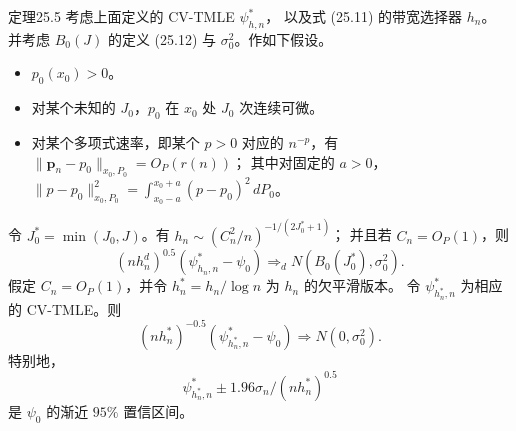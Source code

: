\begin{bookresult}{定理}{25.5}
考虑上面定义的 CV-TMLE $\psi^*_{h,n}$，
以及式 (25.11) 的带宽选择器 $h_n$。
并考虑 $B_0(J)$ 的定义 (25.12) 与 $\sigma_0^2$。作如下假设。
\begin{itemize}
\item $p_0(x_0)>0$。
\item 对某个未知的 $J_0$，$p_0$ 在 $x_0$ 处 $J_0$ 次连续可微。
\item 对某个多项式速率，即某个 $p>0$ 对应的 $n^{-p}$，有
$\|\mathbf p_n-p_0\|_{x_0,P_0}=O_P(r(n))$；
其中对固定的 $a>0$，
$\|p-p_0\|_{x_0,P_0}^2
=\int_{x_0-a}^{x_0+a}(p-p_0)^2\,dP_0$。
\end{itemize}
令 $J_0^*=\min(J_0,J)$。有
$h_n\sim(C_n^2/n)^{-1/(2J_0^*+1)}$；
并且若 $C_n=O_P(1)$，则
\[
 (nh_n^d)^{0.5}(\psi^*_{h_n,n}-\psi_0)
 \Rightarrow_dN(B_0(J_0^*),\sigma_0^2).
\]
假定 $C_n=O_P(1)$，并令 $h_n^*=h_n/\log n$
为 $h_n$ 的欠平滑版本。
令 $\psi^*_{h_n^*,n}$ 为相应的 CV-TMLE。则
\[
 (nh_n^*)^{-0.5}(\psi^*_{h_n^*,n}-\psi_0)
 \Rightarrow N(0,\sigma_0^2).
\]
特别地，
\[
 \psi^*_{h_n^*,n}\pm1.96\sigma_n/(nh_n^*)^{0.5}
\]
是 $\psi_0$ 的渐近 $95\%$ 置信区间。
\end{bookresult}
